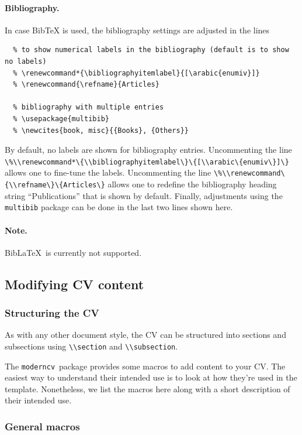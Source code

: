 \documentclass[a4paper, 11pt]{article}
\newcommand{\note}{\paragraph{Note.}}
\newcommand{\code}[1]{\lstinline!#1!}
\newcommand{\moderncv}{\code{moderncv}}
\newcommand{\Moderncv}{\moderncv~}
\newcommand{\biblatex}{BibLaTeX}
\newcommand{\Biblatex}{\biblatex~}
\begin{document}
\paragraph{Bibliography.}
In case BibTeX is used, the bibliography settings are adjusted in the lines
\begin{lstlisting}
  % to show numerical labels in the bibliography (default is to show no labels)
  % \renewcommand*{\bibliographyitemlabel}{[\arabic{enumiv}]}
  % \renewcommand{\refname}{Articles}

  % bibliography with multiple entries
  % \usepackage{multibib}
  % \newcites{book, misc}{{Books}, {Others}}
\end{lstlisting}
By default, no labels are shown for bibliography entries.
Uncommenting the line \code{\%\\renewcommand*\{\\bibliographyitemlabel\}\{[\\arabic\{enumiv\}]\}}
allows one to fine-tune the labels.
Uncommenting the line \code{\%\\renewcommand\{\\refname\}\{Articles\}} allows one to redefine the bibliography heading string ``Publications'' that is shown by default.
Finally, adjustments using the \code{multibib} package can be done in the last two lines shown here.

\note \Biblatex is currently not supported.

\subsection{Modifying CV content}
\subsubsection{Structuring the CV}
As with any other document style, the CV can be structured into sections and subsections using \code{\\section} and \code{\\subsection}.

The \Moderncv package provides some macros to add content to your CV.
The easiest way to understand their intended use is to look at how they're used in the template.
Nonetheless, we list the macros here along with a short description of their intended use.

\subsubsection{General macros}
\end{document}
